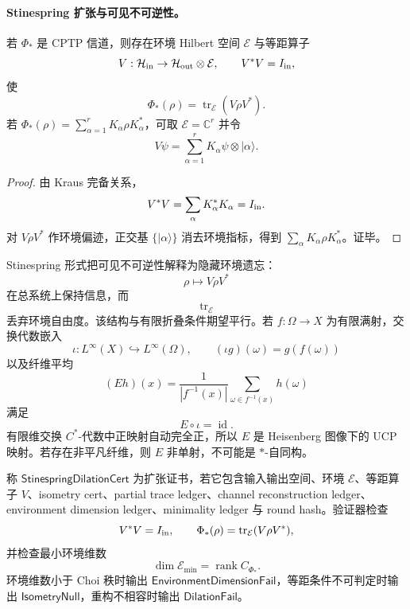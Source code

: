 \paragraph{Stinespring 扩张与可见不可逆性。}
\begin{theorem}[Stinespring 扩张]\label{thm:typed-address-biaxial-completion-stinespring-dilation}
若 \(\Phi_{\ast}\) 是 CPTP 信道，则存在环境 Hilbert 空间 \(\mathcal E\) 与等距算子
\[
V:\mathcal H_{\rm in}\to\mathcal H_{\rm out}\otimes\mathcal E,
\qquad
V^*V=I_{\rm in},
\]
使
\[
\boxed{
\Phi_{\ast}(\rho)
=
\operatorname{tr}_{\mathcal E}(V\rho V^*).
}
\]
若 \(\Phi_{\ast}(\rho)=\sum_{\alpha=1}^{r}K_\alpha\rho K_\alpha^*\)，可取 \(\mathcal E=\mathbb C^r\) 并令
\[
V\psi=\sum_{\alpha=1}^{r}K_\alpha\psi\otimes|\alpha\rangle.
\]
\end{theorem}
\begin{proof}
由 Kraus 完备关系，
\[
V^*V=\sum_\alpha K_\alpha^*K_\alpha=I_{\rm in}.
\]
对 \(V\rho V^*\) 作环境偏迹，正交基 \(\{|\alpha\rangle\}\) 消去环境指标，得到 \(\sum_\alpha K_\alpha\rho K_\alpha^*\)。证毕。
\end{proof}

Stinespring 形式把可见不可逆性解释为隐藏环境遗忘：
\[
\rho\mapsto V\rho V^*
\]
在总系统上保持信息，而
\[
\operatorname{tr}_{\mathcal E}
\]
丢弃环境自由度。该结构与有限折叠条件期望平行。若 \(f:\Omega\to X\) 为有限满射，交换代数嵌入
\[
\iota:L^\infty(X)\hookrightarrow L^\infty(\Omega),
\qquad
(\iota g)(\omega)=g(f(\omega))
\]
以及纤维平均
\[
(Eh)(x)=
\frac1{|f^{-1}(x)|}
\sum_{\omega\in f^{-1}(x)}h(\omega)
\]
满足
\[
E\circ\iota=\operatorname{id}.
\]
有限维交换 \(C^*\)-代数中正映射自动完全正，所以 \(E\) 是 Heisenberg 图像下的 UCP 映射。若存在非平凡纤维，则 \(E\) 非单射，不可能是 \(*\)-自同构。

\begin{definition}\label{def:typed-address-biaxial-completion-stinespring-dilation-cert}
称 \(\mathsf{StinespringDilationCert}\) 为扩张证书，若它包含输入输出空间、环境 \(\mathcal E\)、等距算子 \(V\)、isometry cert、partial trace ledger、channel reconstruction ledger、environment dimension ledger、minimality ledger 与 round hash。验证器检查
\[
V^*V=I_{\rm in},
\qquad
\Phi_{\ast}(\rho)=\operatorname{tr}_{\mathcal E}(V\rho V^*),
\]
并检查最小环境维数
\[
\dim\mathcal E_{\min}=\operatorname{rank}C_{\Phi_{\ast}}.
\]
环境维数小于 Choi 秩时输出 \(\mathsf{EnvironmentDimensionFail}\)，等距条件不可判定时输出 \(\mathsf{IsometryNull}\)，重构不相容时输出 \(\mathsf{DilationFail}\)。
\end{definition}

